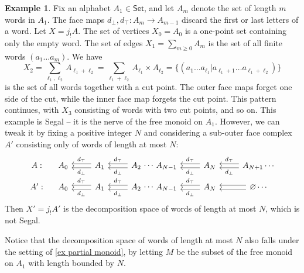 \documentclass{amsart}
\theoremstyle{definition}
\newtheorem{example}[theorem]{Example}
\theoremstyle{remark}
\newcommand{\set}{\mathsf{Set}}
\begin{document}
\begin{example}\label{example words}
Fix an alphabet $A_1 \in \set$, and let $A_m$ denote the set of length $m$ words in $A_1$.
The face maps $d_\bot, d_\top \colon A_m \to A_{m-1}$ discard the first or last letters of a word.
Let $X = j_!A$.
The set of vertices $X_0 = A_0$ is a one-point set containing only the empty word.
The set of edges $X_1 = \sum_{m\geq 0} A_m$ is the set of all finite words $(a_1 \dots a_m)$.
We have
\[
  X_2 = \sum_{\ell_1, \ell_2} A_{\ell_1 + \ell_2} = \sum_{\ell_1+\ell_2} A_{\ell_1} \times A_{\ell_2} = \{ (a_1 \dots a_{\ell_1} | a_{\ell_1+1} \dots a_{\ell_1+\ell_2} ) \}
\]
is the set of all words together with a cut point.
The outer face maps forget one side of the cut, while the inner face map forgets the cut point.
This pattern continues, with $X_3$ consisting of words with two cut points, and so on.
This example is Segal -- it is the nerve of the free monoid on $A_1$.
However, we can tweak it by fixing a positive integer $N$ and considering a sub-outer face complex $A'$ consisting only of words of length at most $N$:
\begin{equation*}\label{eq truncation} 
\begin{tikzcd}[row sep=small]
A: &[-0.5cm] A_0 & 
A_1 \lar[shift left, "d_\bot"] \lar[shift right, "d_\top"'] & 
A_2 \lar[shift left, "d_\bot"] \lar[shift right, "d_\top"'] %
\rar[phantom, "\cdots"]  &[-0.5cm] 
A_{N-1} &
A_{N} \lar[shift left, "d_\bot"] \lar[shift right, "d_\top"'] &
A_{N+1} \lar[shift left, "d_\bot"] \lar[shift right, "d_\top"'] \cdots
\\
A': &[-0.5cm] A_0 & 
A_1 \lar[shift left, "d_\bot"] \lar[shift right, "d_\top"'] & 
A_2 \lar[shift left, "d_\bot"] \lar[shift right, "d_\top"'] %
\rar[phantom, "\cdots"]  &[-0.5cm] 
A_{N-1} &
A_{N} \lar[shift left, "d_\bot"] \lar[shift right, "d_\top"'] &
\varnothing \lar[shift left] \lar[shift right] \cdots
\end{tikzcd} \end{equation*}
Then $X' = j_!A'$ is the decomposition space of words of length at most $N$, which is not Segal.
\end{example}

Notice that the decomposition space of words of length at most $N$ also falls under the setting of \cref{ex partial monoid}, by letting $M$ be the subset of the free monoid on $A_1$ with length bounded by $N$.
\end{document}
